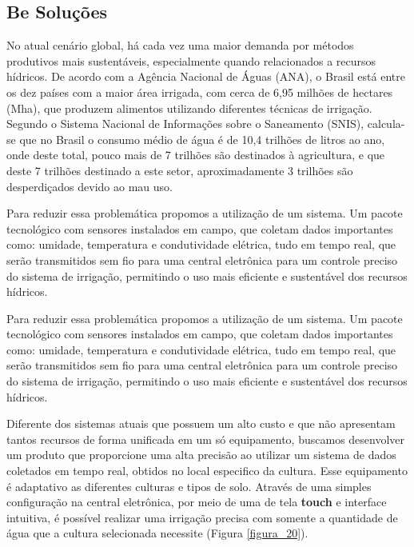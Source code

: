 \subsection{Be Soluções}

No atual cenário global, há cada vez uma maior demanda por métodos produtivos mais sustentáveis, especialmente quando relacionados a recursos hídricos. De acordo com a Agência Nacional de Águas (ANA), o Brasil está entre os dez países com a maior área irrigada, com cerca de 6,95 milhões de hectares (Mha), que produzem alimentos utilizando diferentes técnicas de irrigação. Segundo o Sistema Nacional de Informações sobre o Saneamento (SNIS), calcula-se que no Brasil o consumo médio de água é de 10,4 trilhões de litros ao ano, onde deste total, pouco mais de 7 trilhões são destinados à agricultura, e que deste 7 trilhões destinado a este setor, aproximadamente 3 trilhões são desperdiçados devido ao mau uso.

Para reduzir essa problemática propomos a utilização de um sistema. Um pacote tecnológico com sensores instalados em campo, que coletam dados importantes como: umidade, temperatura e condutividade elétrica, tudo em tempo real, que serão transmitidos sem fio para uma central eletrônica para um controle preciso do sistema
de irrigação, permitindo o uso mais eficiente e sustentável dos recursos hídricos.

Para reduzir essa problemática propomos a utilização de um sistema. Um pacote tecnológico com sensores instalados em campo, que coletam dados importantes como: umidade, temperatura e condutividade elétrica, tudo em tempo real, que serão transmitidos sem fio para uma central eletrônica para um controle preciso do sistema de irrigação, permitindo o uso mais eficiente e sustentável dos recursos hídricos.

Diferente dos sistemas atuais que possuem um alto custo e que não apresentam tantos recursos de forma unificada em um só equipamento, buscamos desenvolver um produto que proporcione uma alta precisão ao utilizar um sistema de dados coletados em tempo real, obtidos no local especifico da cultura. Esse equipamento é adaptativo as diferentes culturas e tipos de solo. Através de uma simples configuração na central eletrônica, por meio de uma de tela \textbf{touch} e interface intuitiva, é possível realizar uma irrigação precisa com somente a quantidade de água que a cultura selecionada necessite (Figura \ref{figura_20}).

